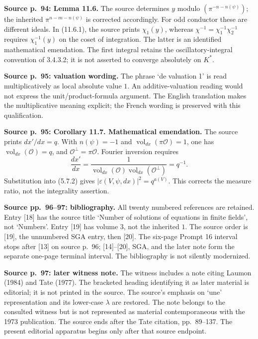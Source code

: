 \documentclass[10pt,letterpaper]{article}
\begin{document}
\begin{description}[style=nextline,leftmargin=2.6em,labelwidth=2.2em,font=\normalfont\bfseries]
\item[E11] \textbf{Source p.~94: Lemma 11.6.} The source determines \(y\) modulo \((\pi^{-n-n(\psi)})\); the inherited \(\pi^{n-m-n(\psi)}\) is corrected accordingly. For odd conductor these are different ideals. In (11.6.1), the source prints \(\chi_1(y)\), whereas \(\chi^{-1}=\chi_1^{-1}\chi_2^{-1}\) requires \(\chi_1^{-1}(y)\) on the coset of integration. The latter is an identified mathematical emendation. The first integral retains the oscillatory-integral convention of 3.4.3.2; it is not asserted to converge absolutely on \(K^*\).

\item[E12] \textbf{Source p.~95: valuation wording.} The phrase `de valuation 1' is read multiplicatively as local absolute value \(1\). An additive-valuation reading would not express the unit/product-formula argument. The English translation makes the multiplicative meaning explicit; the French wording is preserved with this qualification.

\item[E13] \textbf{Source p.~95: Corollary 11.7. Mathematical emendation.} The source prints \(dx'/dx=q\). With \(n(\psi)=-1\) and \(\operatorname{vol}_{dx}(\pi\mathcal O)=1\), one has \(\operatorname{vol}_{dx}(\mathcal O)=q\), and \(\mathcal O^\perp=\pi\mathcal O\). Fourier inversion requires
\[
 \frac{dx'}{dx}=\frac{1}{\operatorname{vol}_{dx}(\mathcal O)\operatorname{vol}_{dx}(\mathcal O^\perp)}=q^{-1}.
\]
Substitution into (5.7.2) gives \( |\varepsilon(V,\psi,dx)|^2=q^{a(V)}\). This corrects the measure ratio, not the integrality assertion.

\item[E14] \textbf{Source pp.~96--97: bibliography.} All twenty numbered references are retained. Entry [18] has the source title `Number of solutions of equations in finite fields', not `Numbers'. Entry [19] has volume \(3\), not the inherited \(1\). The source order is [19], the unnumbered SGA entry, then [20]. The six-page Prompt 16 interval stops after [13] on source p.~96; [14]--[20], SGA, and the later note form the separate one-page terminal interval. The bibliography is not silently modernized.

\item[E15] \textbf{Source p.~97: later witness note.} The witness includes a note citing Laumon (1984) and Tate (1977). The bracketed heading identifying it as later material is editorial; it is not printed in the source. The source's emphasis on `une' representation and its lower-case \(\lambda\) are restored. The note belongs to the consulted witness but is not represented as material contemporaneous with the 1973 publication. The source ends after the Tate citation, pp.~89--137. The present editorial apparatus begins only after that source endpoint.


\end{description}
\end{document}
